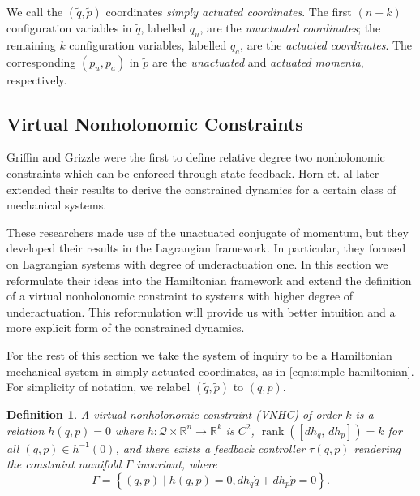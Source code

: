 \documentclass[journal,twoside,web]{ieeecolor}
\newtheorem{defn}[thm]{Definition} %
\DeclareMathOperator{\Rank}{rank}
\newcommand*{\rank}[1]{\Rank\left(#1\right)}
\newcommand*{\inv}{^\mathsf{-1}}
\newcommand*{\R}{\mathbb{R}}
\begin{document}
We call the \((\tilde{q},\tilde{p})\) coordinates
\textit{simply actuated coordinates}.
The first \((n-k)\) configuration variables in \(\tilde{q}\), labelled \(q_u\),
are the \textit{unactuated coordinates}; 
the remaining \(k\) configuration variables, labelled \(q_a\), are the
\textit{actuated coordinates}.
The corresponding \((p_u, p_a)\) in \(\tilde{p}\) are the \textit{unactuated}
and \textit{actuated momenta}, respectively.

\subsection{Virtual Nonholonomic Constraints}

Griffin and Grizzle \cite{nhvc_dynamic_walking} were the first to define
relative degree two nonholonomic constraints which can be enforced
through state feedback.
Horn et. al later extended their results
\cite{hybrid_zero_dynamics_bipedal_nhvcs} to derive the constrained dynamics for
a certain class of mechanical systems.

These researchers made use of the unactuated conjugate of momentum, but they
developed their results in the Lagrangian framework.
In particular, they focused on Lagrangian systems with degree of underactuation
one.
In this section we reformulate their ideas into the Hamiltonian framework and
extend the definition of a virtual nonholonomic constraint to systems with
higher degree of underactuation.
This reformulation will provide us with better intuition and a more explicit form of the
constrained dynamics.

For the rest of this section we take the system of inquiry to be a
Hamiltonian mechanical system in simply actuated coordinates, as in
\eqref{eqn:simple-hamiltonian}.
For simplicity of notation, we relabel \((\tilde{q},\tilde{p})\) to \((q,p)\).

\begin{defn}\label{defn:vnhc}
    A \textit{virtual nonholonomic constraint} (VNHC) \textit{of order \(k\)} is a
    relation \(h(q,p) = 0\) where \(h : \mathcal{Q}\times\R^n \rightarrow \R^k\) is
    \(C^2\), \(\rank{\left[ dh_q,\, dh_p \right]} = k\) for all 
    \((q,p) \in h\inv(0)\), and there exists a feedback controller \(\tau(q,p)\)
    rendering the \textit{constraint manifold} \(\Gamma\) invariant,
    where
    \begin{equation}
        \Gamma = \left\{(q,p) \mid h(q,p) = 0, dh_q \dot{q} + dh_p \dot{p} = 0\right\}
        .
    \end{equation}
\end{defn}
\end{document}
